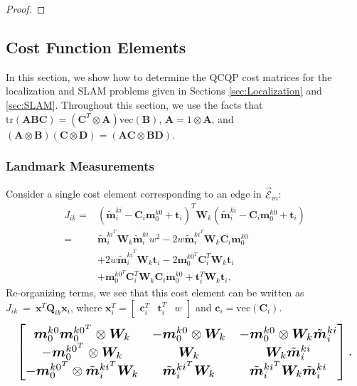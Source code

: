 \documentclass[lettersize,journal]{IEEEtran}
\newcommand{\EdgeSet}{\vec{\bm{\mathcal{E}}}}
\newcommand{\vect}[1]{\mbox{vec}(#1)}
\newcommand{\tr}[1]{\mbox{tr}\left(#1\right)}
\begin{document}
{\begin{proof}
\end{proof}

\subsection{Cost Function Elements}\label{App:LocCost}

In this section, we show how to determine the QCQP cost matrices for the localization and SLAM problems given in Sections \ref{sec:Localization} and \ref{sec:SLAM}. Throughout this section, we use the facts that $ \tr{\bm{A}\bm{B}\bm{C}} = (\bm{C}^T\otimes\bm{A}) \vect{\bm{B}}$, $ \bm{A} = 1\otimes\bm{A} $, and $ (\bm{A}\otimes\bm{B})(\bm{C}\otimes\bm{D}) = (\bm{AC}\otimes\bm{BD}) $\cite{magnusMatrixDifferentialCalculus2019}. 

\subsubsection{Landmark Measurements}

Consider a single cost element corresponding to an edge in $\EdgeSet_m $:
\begin{align*}
	J_{ik}=&(\tilde{\bm{m}}_i^{ki} - \bm{C}_i\bm{m}_0^{k0} + \bm{t}_i)^T \bm{W}_k (\tilde{\bm{m}}_i^{ki} - \bm{C}_i\bm{m}_0^{k0} + \bm{t}_i) \\
	=& \tilde{\bm{m}}_i^{ki^T}\bm{W}_k\tilde{\bm{m}}_i^{ki} w^2 - 2 w\tilde{\bm{m}}_i^{ki^T}\bm{W}_k\bm{C}_i\bm{m}_0^{k0}  \\
	&+ 2 w\tilde{\bm{m}}_i^{ki^T}\bm{W}_k\bm{t}_i -2\bm{m}_0^{k0^T}\bm{C}_i^T\bm{W}_k\bm{t}_i\\
	& + \bm{m}_0^{k0^T}\bm{C}_i^T\bm{W}_k\bm{C}_i\bm{m}_0^{k0} + \bm{t}_i^T\bm{W}_k\bm{t}_i,
\end{align*}
Re-organizing terms, we see that this cost element can be written as $J_{ik}~=~\bm{x}^T\bm{Q}_{ik}\bm{x}_i$, where $ \bm{x}_i^T = \begin{bmatrix} \bm{c}_i^T &  \bm{t}_i^T & w \end{bmatrix} $ and $ \bm{c}_i=\vect{\bm{C}_i} $.
\begin{equation*}
	\resizebox{0.98\columnwidth}{!}{$\begin{bmatrix}
			\bm{m}_0^{k0}\bm{m}_0^{k0^T} \otimes \bm{W}_k  & -\bm{m}_0^{k0}\otimes\bm{W}_k & -\bm{m}_0^{k0}\otimes\bm{W}_k\tilde{\bm{m}}_i^{ki}\\
			 -\bm{m}_0^{k0^T}\otimes\bm{W}_k & \bm{W}_k & \bm{W}_k\tilde{\bm{m}}_i^{ki} \\
			-\bm{m}_0^{k0^T}\otimes\tilde{\bm{m}}_i^{ki^T}\bm{W}_k & \tilde{\bm{m}}_i^{ki^T}\bm{W}_k & \tilde{\bm{m}}_i^{ki^T}\bm{W}_k\tilde{\bm{m}}_i^{ki}
		\end{bmatrix}.$}
\end{equation*}

}
\end{document}
